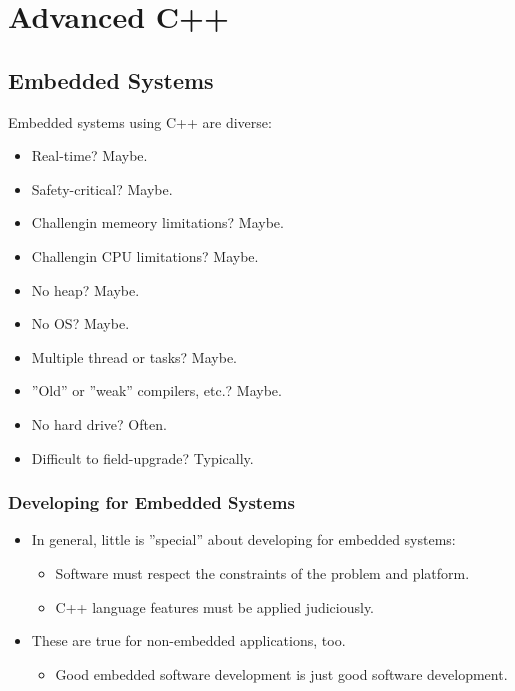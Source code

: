 \section{Advanced C++}

\subsection{Embedded Systems}
Embedded systems using C++ are diverse:
\begin{multicols}{2}
\begin{itemize}
	\item Real-time? Maybe.
	\item Safety-critical? Maybe.
	\item Challengin memeory limitations? Maybe.
	\item Challengin CPU limitations? Maybe.
	\item No heap? Maybe.
\end{itemize}
\columnbreak
\begin{itemize}
	\item No OS? Maybe.
	\item Multiple thread or tasks? Maybe.
	\item ''Old'' or ''weak'' compilers, etc.? Maybe.
	\item No hard drive? Often.
	\item Difficult to field-upgrade? Typically.
\end{itemize}
\end{multicols}
\subsubsection{Developing for Embedded Systems}
\begin{itemize}
	\item In general, little is ''special'' about developing for embedded systems:
	\begin{itemize}
		\item Software must respect the constraints of the problem and platform.
		\item C++ language features must be applied judiciously.
	\end{itemize}
	\item These are true for non-embedded applications, too.
	\begin{itemize}
		\item Good embedded software development is just good software development.
	\end{itemize}
\end{itemize}

